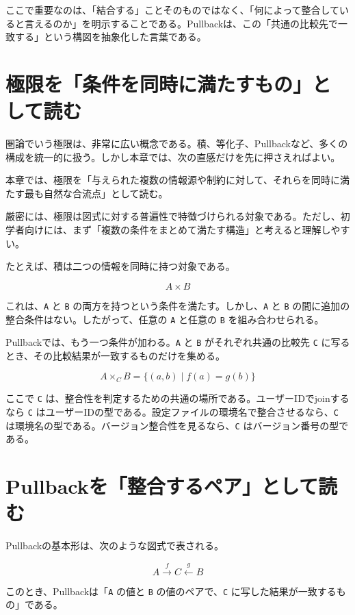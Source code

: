 ここで重要なのは、「結合する」ことそのものではなく、「何によって整合していると言えるのか」を明示することである。Pullbackは、この「共通の比較先で一致する」という構図を抽象化した言葉である。

\section{極限を「条件を同時に満たすもの」として読む}

圏論でいう極限は、非常に広い概念である。積、等化子、Pullbackなど、多くの構成を統一的に扱う。しかし本章では、次の直感だけを先に押さえればよい。

\begin{definitionbox}
本章では、極限を「与えられた複数の情報源や制約に対して、それらを同時に満たす最も自然な合流点」として読む。

厳密には、極限は図式に対する普遍性で特徴づけられる対象である。ただし、初学者向けには、まず「複数の条件をまとめて満たす構造」と考えると理解しやすい。
\end{definitionbox}

たとえば、積は二つの情報を同時に持つ対象である。

\[
A \times B
\]

これは、\texttt{A} と \texttt{B} の両方を持つという条件を満たす。しかし、\texttt{A} と \texttt{B} の間に追加の整合条件はない。したがって、任意の \texttt{A} と任意の \texttt{B} を組み合わせられる。

Pullbackでは、もう一つ条件が加わる。\texttt{A} と \texttt{B} がそれぞれ共通の比較先 \texttt{C} に写るとき、その比較結果が一致するものだけを集める。

\[
A \times_C B = \{(a,b) \mid f(a) = g(b)\}
\]

ここで \texttt{C} は、整合性を判定するための共通の場所である。ユーザーIDでjoinするなら \texttt{C} はユーザーIDの型である。設定ファイルの環境名で整合させるなら、\texttt{C} は環境名の型である。バージョン整合性を見るなら、\texttt{C} はバージョン番号の型である。

\section{Pullbackを「整合するペア」として読む}

Pullbackの基本形は、次のような図式で表される。

\[
A \xrightarrow{f} C \xleftarrow{g} B
\]

このとき、Pullbackは「\texttt{A} の値と \texttt{B} の値のペアで、\texttt{C} に写した結果が一致するもの」である。

